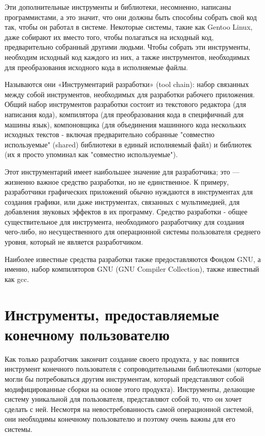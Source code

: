 \documentclass[12pt]{book}
\begin{document}
Эти дополнительные инструменты и библиотеки, несомненно, написаны программистами, а это значит, что они должны быть способны собрать свой код так, чтобы он работал в системе. Некоторые системы, такие как Gentoo Linux, даже собирают их вместо того, чтобы полагаться на исходный код, предварительно собранный другими людьми. Чтобы собрать эти инструменты, необходим исходный код каждого из них,  а также инструментов, необходимых для преобразования исходного кода в исполняемые файлы.

Называются они «Инструментарий разработки» (tool chain): набор связанных между собой инструментов, необходимых для разработки рабочего приложения. Общий набор инструментов разработки состоит из текстового редактора (для написания кода), компилятора (для преобразования кода в специфичный для машины язык), компоновщика (для объединения машинного кода нескольких исходных текстов - включая предварительно собранные "совместно используемые"{} (shared) библиотеки в единый исполняемый файл) и библиотек (их я просто упоминал как "совместно используемые").

Этот инструментарий имеет наибольшее значение для разработчика; это — жизненно важное средство разработки, но не единственное. К примеру, разработчики графических приложений обычно нуждаются в инструментах для создания графики, или даже инструментах, связанных с мультимедией, для добавления звуковых эффектов в их программу. Средство разработки - общее существительное для инструмента, необходимого разработчику для создания чего-либо, но несущественного для операционной системы пользователя среднего уровня, который не является разработчиком.

Наиболее известные средства разработки также предоставляются Фондом GNU, а именно, набор компиляторов GNU (GNU Compiler Collection), также известный как gcc.

\section{Инструменты, предоставляемые конечному пользователю}

Как только разработчик закончит создание своего продукта, у вас появится инструмент конечного пользователя с сопроводительными библиотеками (которые могли бы потребоваться другим инструментам, который представляют собой модифицированные сборки на основе этого продукта). Инструменты, делающие систему уникальной для пользователя, представляют собой то, что он хочет сделать с ней. Несмотря на невостребованность самой  операционной системой, они необходимы конечному пользователю и поэтому очень важны для его системы.
\end{document}
